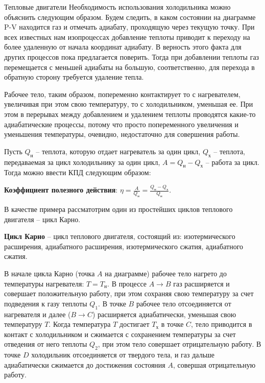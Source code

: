 \documentclass{article}
\newcommand{\definition}[2]{\begin{samepage} \textbf{#1} -- #2. \end{samepage} \par}
\newcommand{\namedequation}[2]{\begin{samepage} \textbf{#1}: $\displaystyle#2$. \end{samepage} \par}
\begin{document}
\begin{section}{Тепловые двигатели}
		Необходимость использования холодильника можно объяснить следующим образом. Будем следить, в каком состоянии на диаграмме P-V находится газ и отмечать адиабату, проходящую через текущую точку. При всех известных нам изопроцессах добавление теплоты приводит к переходу на более удаленную от начала координат адиабату. В верность этого факта для других процессов пока предлагается поверить. Тогда при добавлении теплоты газ перемещается с меньшей адиабаты на большую, соответственно, для перехода в обратную сторону требуется удаление тепла.

		Рабочее тело, таким образом, попеременно контактирует то с нагревателем, увеличивая при этом свою температуру, то с холодильником, уменьшая ее. При этом в перерывах между добавлением и удалением теплоты проводятся какие-то адиабатические процессы, потому что просто попеременного увеличения и уменьшения температуры, очевидно, недостаточно для совершения работы.

		Пусть $Q_{\text{н}}$ -- теплота, которую отдает нагреватель за один цикл, $Q_{\text{х}}$ -- теплота, передаваемая за цикл холодильнику за один цикл, $A = Q_{\text{н}} - Q_{\text{х}}$ -- работа за цикл. Тогда можно ввести КПД следующим образом:

		\namedequation{Коэффициент полезного действия}{\eta = \frac{A}{Q_{\text{н}}} = \frac{Q_{\text{н}} - Q_{\text{х}}}{Q_{\text{н}}}}

		В качестве примера рассматотрим один из простейших циклов теплового двигателя -- цикл Карно.

		\definition{Цикл Карно}{цикл теплового двигателя, состоящий из: изотермического расширения, адиабатного расширения, изотермического сжатия, адиабатного сжатия}

		

		В начале цикла Карно (точка $A$ на диаграмме) рабочее тело нагрето до температуры нагревателя: $T = T_{\text{н}}$. В процессе $A \to B$ газ расширяется и совершает положительную работу, при этом сохраняя свою температуру за счет подведения к газу теплоты $Q_1$. В точке $B$ рабочее тело отсоединяется от нагревателя и далее ($B \to C$) расширяется адиабатически, уменьшая свою температуру $T$. Когда температура $T$ достигает $T_{\text{х}}$ в точке $C$, тело приводится в контакт с холодильником и сжимается с сохранением температуры за счет отведения от него теплоты $Q_2$, при этом тело совершает отрицательную работу. В точке $D$ холодильник отсоединяется от твердого тела, и газ дальше адиабатически сжимается до достижения состояния $A$, совершая отрицательную работу.


\end{section}
\end{document}

